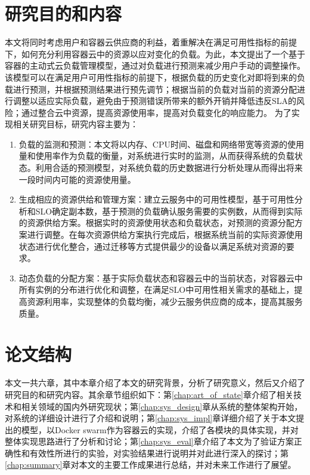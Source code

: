 \section{研究目的和内容}
本文将同时考虑用户和容器云供应商的利益，着重解决在满足可用性指标的前提下，如何充分利用容器云中的资源以应对变化的负载。为此，本文提出了一个基于容器的主动式云负载管理模型，通过对负载进行预测来减少用户手动的调整操作。该模型可以在满足用户可用性指标的前提下，根据负载的历史变化对即将到来的负载进行预测，并根据预测结果进行预先调节；根据当前的负载对当前的资源分配进行调整以适应实际负载，避免由于预测错误所带来的额外开销并降低违反SLA的风险；通过整合云中资源，提高资源使用率，提高对负载变化的响应能力。
为了实现相关研究目标，研究内容主要为：
\begin{enumerate}
\item 负载的监测和预测：本文将以内存、CPU时间、磁盘和网络带宽等资源的使用量和使用率作为负载的衡量，对系统进行实时的监测，从而获得系统的负载状态。利用合适的预测模型，对系统负载的历史数据进行分析处理从而得出将来一段时间内可能的资源使用量。
\item 生成相应的资源供给和管理方案：建立云服务中的可用性模型，基于可用性分析和SLO确定副本数，基于预测的负载确认服务需要的实例数，从而得到实际的资源供给方案。根据实时的资源使用状态和负载状态，对预测的资源分配方案进行调整。在每次资源供给方案执行完成后，根据系统当前的实际资源使用状态进行优化整合，通过迁移等方式提供最少的设备以满足系统对资源的要求。
\item 动态负载的分配方案：基于实际负载状态和容器云中的当前状态，对容器云中所有实例的分布进行优化和调整，在满足SLO中可用性相关需求的基础上，提高资源利用率，实现整体的负载均衡，减少云服务供应商的成本，提高其服务质量。
\end{enumerate}

\section{论文结构}
本文一共六章，其中本章介绍了本文的研究背景，分析了研究意义，然后又介绍了研究目的和研究内容。其余章节组织如下：第\ref{chap:art_of_state}章介绍了相关技术和相关领域的国内外研究现状；第\ref{chap:sys_design}章从系统的整体架构开始，对系统的详细设计进行了介绍和说明；第\ref{chap:sys_impl}章详细介绍了关于本文提出的模型，以Docker swarm作为容器云的实现，介绍了各模块的具体实现，并对整体实现思路进行了分析和讨论；第\ref{chap:sys_eval}章介绍了本文为了验证方案正确性和有效性所进行的实验，对实验结果进行说明并对此进行深入的探讨；第\ref{chap:summary}章对本文的主要工作成果进行总结，并对未来工作进行了展望。